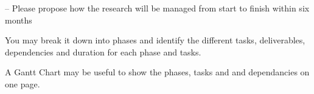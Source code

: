 -- Please propose how the research will be managed from start to finish within six months


You may break it down into phases and identify the different tasks, deliverables, dependencies and duration for each phase and tasks. 

A Gantt Chart may be useful to show the phases, tasks and and dependancies on one page.
